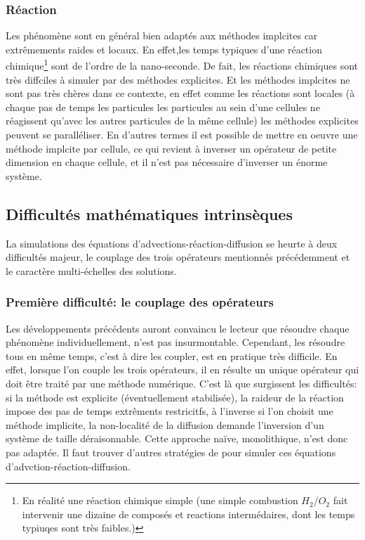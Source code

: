 \subsubsection{Réaction}
    Les phénomène sont en général bien adaptés aux méthodes implcites car extrêmements raides et locaux.
    En effet,les temps typiques d'une réaction chimique\footnote{
    En réalité une réaction chimique simple (une simple combustion $H_2/O_2$ fait intervenir une dizaine de composés et reactions intermédaires, dont les temps typiuqes sont très faibles.)} sont de l'ordre de la nano-seconde.
    De fait, les réactions chimiques sont très diffciles à simuler par des méthodes explicites.
    Et les méthodes implcites ne sont pas très chères dans ce contexte, en effet comme les réactions sont locales 
    (à chaque pas de temps les particules les particules au sein d'une cellules ne réagissent qu'avec les autres particules de la même cellule)
    les méthodes explicites peuvent se paralléliser. En d'autres termes il est possible de mettre en oeuvre une méthode implcite par cellule,
    ce qui revient à inverser un opérateur de petite dimension en chaque cellule, et il n'est pas nécessaire d'inverser un énorme système.

\subsection{Difficultés mathématiques intrinsèques}
    La simulations des équations d'advections-réaction-diffusion se heurte à deux difficultés majeur, le couplage des trois opérateurs mentionnés précédemment
    et le caractère multi-échelles des solutions.

    \subsubsection{Première difficulté: le couplage des opérateurs}
        Les développements précédents auront convaincu le lecteur que résoudre chaque phénomène individuellement, n'est pas insurmontable. 
        Cependant, les résoudre tous en même temps, c'est à dire les coupler, est en pratique très difficile.
        En effet, lorsque l'on couple les trois opérateurs, il en résulte un unique opérateur qui doit être traité par une méthode numérique.
        C'est là que surgissent les difficultés: si la méthode est explicite (éventuellement stabilisée), la raideur de la réaction impose des pas de temps extrêments restricitfs,
        à l'inverse si l'on choisit une méthode implicite, la non-localité de la diffusion demande l'inversion d'un système de taille déraisonnable. 
        Cette approche naïve, monolithique, n'est donc pas adaptée. Il faut trouver d'autres stratégies de pour simuler ces équations d'advction-réaction-diffusion.

